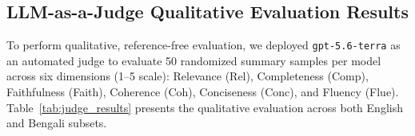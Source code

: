 \documentclass[runningheads]{llncs}
\begin{document}
\subsection{LLM-as-a-Judge Qualitative Evaluation Results}\label{subsec:judge_results}

To perform qualitative, reference-free evaluation, we deployed \texttt{gpt-5.6-terra} as an automated judge to evaluate 50 randomized summary samples per model across six dimensions (1--5 scale): Relevance (Rel), Completeness (Comp), Faithfulness (Faith), Coherence (Coh), Conciseness (Conc), and Fluency (Flue). Table~\ref{tab:judge_results} presents the qualitative evaluation across both English and Bengali subsets.

\begin{table}[t]
\caption{LLM-as-a-Judge (\texttt{gpt-5.6-terra}) 6-criteria qualitative evaluation across the exact same 50 test samples per model (1--5 scale).}\label{tab:judge_results}
\centering
\small
{}
\end{table}
\end{document}
